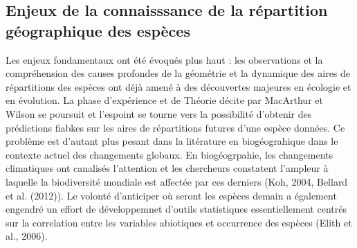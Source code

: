 \subsection*{Enjeux de la connaisssance de la répartition géographique
des
espèces}\label{enjeux-de-la-connaisssance-de-la-ruxe9partition-guxe9ographique-des-espuxe8ces}

Les enjeux fondamentaux ont été évoqués plus haut : les observations et
la compréhension des causes profondes de la géométrie et la dynamique
des aires de répartitions des espèces ont déjà amené à des découvertes
majeures en écologie et en évolution. La phase d'expérience et de
Théorie décite par MacArthur et Wilson se poursuit et l'espoint se
tourne vers la possibilité d'obtenir des prédictions fiabkes sur les
aires de répartitions futures d'une espèce données. Ce problème est
d'autant plus pesant dans la litérature en biogéograhique dans le
contexte actuel des changements globaux. En biogéogrpahie, les
changements climatiques ont canalisés l'attention et les chercheurs
constatent l'ampleur à laquelle la biodiversité mondiale est affectée
par ces derniers (Koh, 2004, Bellard et al. (2012)). Le volonté
d'anticiper où seront les espèces demain a également engendré un effort
de développemnet d'outils statistiques essentiellement centrés sur la
correlation entre les variables abiotiques et occurrence des espèces
(Elith et al., 2006).

